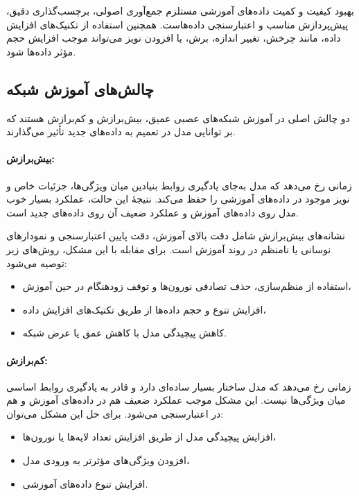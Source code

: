 بهبود کیفیت و کمیت داده‌های آموزشی مستلزم جمع‌آوری اصولی، برچسب‌گذاری دقیق، پیش‌پردازش مناسب و اعتبارسنجی داده‌هاست. همچنین استفاده از تکنیک‌های افزایش داده، مانند چرخش، تغییر اندازه، برش، یا افزودن نویز می‌تواند موجب افزایش حجم مؤثر داده‌ها شود.

\subsection*{چالش‌های آموزش شبکه}

دو چالش اصلی در آموزش شبکه‌های عصبی عمیق، بیش‌برازش و کم‌برازش هستند که بر توانایی مدل در تعمیم به داده‌های جدید تأثیر می‌گذارند.

\paragraph{بیش‌برازش:} زمانی رخ می‌دهد که مدل به‌جای یادگیری روابط بنیادین میان ویژگی‌ها، جزئیات خاص و نویز موجود در داده‌های آموزشی را حفظ می‌کند. نتیجهٔ این حالت، عملکرد بسیار خوب مدل روی داده‌های آموزش و عملکرد ضعیف آن روی داده‌های جدید است.

نشانه‌های بیش‌برازش شامل دقت بالای آموزش، دقت پایین اعتبارسنجی و نمودارهای نوسانی یا نامنظم در روند آموزش است. برای مقابله با این مشکل، روش‌های زیر توصیه می‌شود:

\begin{itemize}
	\item استفاده از منظم‌سازی، حذف تصادفی نورون‌ها و توقف زودهنگام در حین آموزش،
	\item افزایش تنوع و حجم داده‌ها از طریق تکنیک‌های افزایش داده،
	\item کاهش پیچیدگی مدل با کاهش عمق یا عرض شبکه.
\end{itemize}

\paragraph{کم‌برازش:} زمانی رخ می‌دهد که مدل ساختار بسیار ساده‌ای دارد و قادر به یادگیری روابط اساسی میان ویژگی‌ها نیست. این مشکل موجب عملکرد ضعیف هم در داده‌های آموزش و هم در اعتبارسنجی می‌شود. برای حل این مشکل می‌توان:

\begin{itemize}
	\item افزایش پیچیدگی مدل از طریق افزایش تعداد لایه‌ها یا نورون‌ها،
	\item افزودن ویژگی‌های مؤثرتر به ورودی مدل،
	\item افزایش تنوع داده‌های آموزشی.
\end{itemize}

